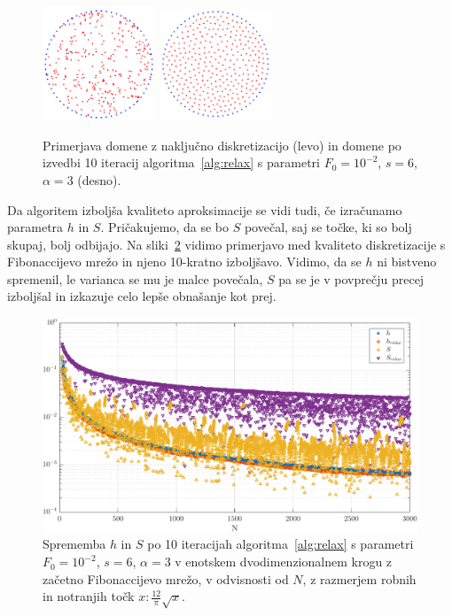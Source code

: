 \documentclass[a4paper,twoside]{article}
\theoremstyle{definition} %
\theoremstyle{plain} %
\numberwithin{equation}{section}
\newlength{\iw}
\begin{document}
\begin{figure}[!ht]
  \centering
  \includegraphics[width=0.3\textwidth]{images/domain_circle.png}
  \hspace{1em}
  \includegraphics[width=0.3\textwidth]{images/domain_circle_relaxed.png}
  \caption{Primerjava domene z naključno diskretizacijo (levo) in domene po
  izvedbi 10 iteracij algoritma~\ref{alg:relax} s parametri $F_0 = 10^{-2}$, $s
  = 6$, $\alpha = 3$ (desno).}
  \label{fig:relax-circle}
\end{figure}

Da algoritem izboljša kvaliteto aproksimacije se vidi tudi, če izračunamo
parametra $h$ in $S$. Pričakujemo, da se bo $S$ povečal, saj se točke, ki so
bolj skupaj, bolj odbijajo. Na sliki~\ref{fig:relax-hs} vidimo primerjavo med
kvaliteto diskretizacije s Fibonaccijevo mrežo in njeno 10-kratno izboljšavo.
Vidimo, da se $h$ ni bistveno spremenil, le varianca se mu je malce povečala,
$S$ pa se je v povprečju precej izboljšal in izkazuje celo lepše obnašanje kot
prej.

\begin{figure}[ht]
  \centering
  \includegraphics[width=\iw]{images/relax_improvement.pdf}
  \caption{Sprememba $h$ in $S$ po 10 iteracijah algoritma~\ref{alg:relax} s
  parametri $F_0 = 10^{-2}$, $s = 6$, $\alpha = 3$ v enotskem dvodimenzionalnem
  krogu z začetno Fibonaccijevo mrežo, v odvisnosti od $N$, z razmerjem robnih in
  notranjih točk $x : \frac{12}{\pi} \sqrt{x}$.}
  \label{fig:relax-hs}
\end{figure}
\end{document}
